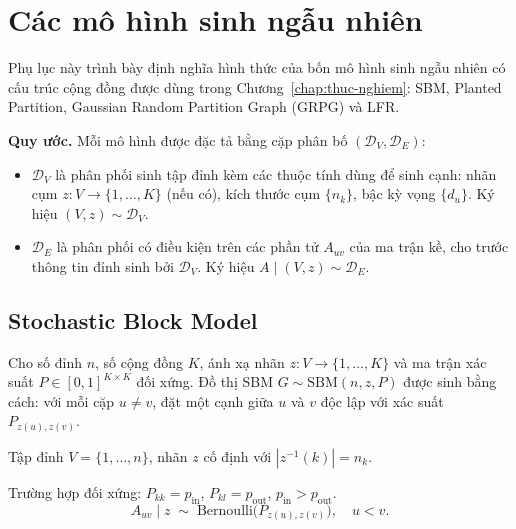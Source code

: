 
\chapter{Các mô hình sinh ngẫu nhiên}
\label{appx:random-models}

Phụ lục này trình bày định nghĩa hình thức của bốn mô hình sinh ngẫu nhiên có cấu trúc cộng đồng được dùng trong Chương~\ref{chap:thuc-nghiem}: SBM, Planted Partition, Gaussian Random Partition Graph (GRPG) và LFR.

\textbf{Quy ước.} Mỗi mô hình được đặc tả bằng cặp phân bố $(\mathcal{D}_V, \mathcal{D}_E)$:
\begin{itemize}[topsep=4pt, itemsep=2pt, parsep=0pt]
    \item $\mathcal{D}_V$ là phân phối sinh tập đỉnh kèm các thuộc tính dùng để sinh cạnh: nhãn cụm $z: V \to \{1, \ldots, K\}$ (nếu có), kích thước cụm $\{n_k\}$, bậc kỳ vọng $\{d_u\}$. Ký hiệu $(V, z) \sim \mathcal{D}_V$.
    \item $\mathcal{D}_E$ là phân phối có điều kiện trên các phần tử $A_{uv}$ của ma trận kề, cho trước thông tin đỉnh sinh bởi $\mathcal{D}_V$. Ký hiệu $A \mid (V, z) \sim \mathcal{D}_E$.
\end{itemize}

\section{Stochastic Block Model}
\label{appsec:sbm}

\begin{definition}
\label{def:sbm}
Cho số đỉnh $n$, số cộng đồng $K$, ánh xạ nhãn $z: V \to \{1, \ldots, K\}$ và ma trận xác suất $P \in [0, 1]^{K \times K}$ đối xứng. Đồ thị SBM $G \sim \mathrm{SBM}(n, z, P)$ được sinh bằng cách: với mỗi cặp $u \neq v$, đặt một cạnh giữa $u$ và $v$ độc lập với xác suất $P_{z(u), z(v)}$.
\end{definition}

\begin{description}[topsep=4pt, itemsep=2pt, leftmargin=2.4cm, style=nextline]
    \item[$\mathcal{D}_V$] Tập đỉnh $V = \{1, \ldots, n\}$, nhãn $z$ cố định với $|z^{-1}(k)| = n_k$.
    \item[$\mathcal{D}_E$] Trường hợp đối xứng: $P_{kk} = p_{\mathrm{in}}$, $P_{kl} = p_{\mathrm{out}}$, $p_{\mathrm{in}} > p_{\mathrm{out}}$.
    \[
        A_{uv} \mid z \;\sim\; \mathrm{Bernoulli}\bigl(P_{z(u), z(v)}\bigr), \quad u < v.
    \]
\end{description}

